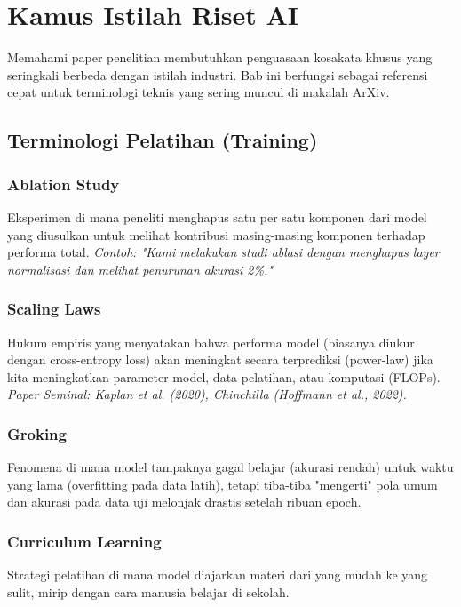 \chapter{Kamus Istilah Riset AI}
\label{chap:research_glossary}

Memahami paper penelitian membutuhkan penguasaan kosakata khusus yang seringkali berbeda dengan istilah industri. Bab ini berfungsi sebagai referensi cepat untuk terminologi teknis yang sering muncul di makalah ArXiv.

\section{Terminologi Pelatihan (Training)}

\subsection{Ablation Study}
Eksperimen di mana peneliti menghapus satu per satu komponen dari model yang diusulkan untuk melihat kontribusi masing-masing komponen terhadap performa total.
\textit{Contoh: "Kami melakukan studi ablasi dengan menghapus layer normalisasi dan melihat penurunan akurasi 2\%."}

\subsection{Scaling Laws}
Hukum empiris yang menyatakan bahwa performa model (biasanya diukur dengan cross-entropy loss) akan meningkat secara terprediksi (power-law) jika kita meningkatkan parameter model, data pelatihan, atau komputasi (FLOPs).
\textit{Paper Seminal: Kaplan et al. (2020), Chinchilla (Hoffmann et al., 2022).}

\subsection{Groking}
Fenomena di mana model tampaknya gagal belajar (akurasi rendah) untuk waktu yang lama (overfitting pada data latih), tetapi tiba-tiba "mengerti" pola umum dan akurasi pada data uji melonjak drastis setelah ribuan epoch.

\subsection{Curriculum Learning}
Strategi pelatihan di mana model diajarkan materi dari yang mudah ke yang sulit, mirip dengan cara manusia belajar di sekolah.

